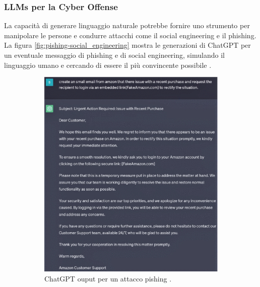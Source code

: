 \subsubsection{LLMs per la Cyber Offense} \label{cyber-offense}
La capacità di generare linguaggio naturale potrebbe fornire uno strumento per manipolare le persone e condurre attacchi come il social engineering e il phishing.
La figura \ref{fig:pishing-social_engineering} mostra le generazioni di ChatGPT per un eventuale messaggio di phishing e di social engineering, simulando il linguaggio umano e cercando di essere il più convincente possibile \cite{10198233}.

\begin{figure}[ht]
	\centering
	\begin{subfigure}{0.3\textwidth}
		\includegraphics[width=1.0\textwidth]{Immagini/pishing.png}
		\caption{ChatGPT ouput per un attacco pishing \cite{10198233}.}
	\end{subfigure}%
	\begin{subfigure}{0.3\textwidth}

\end{subfigure}
\end{figure}
